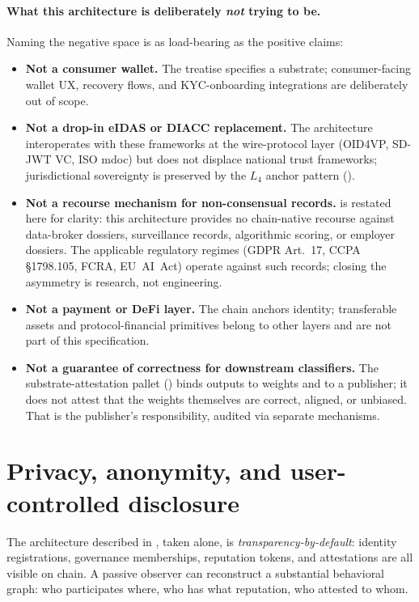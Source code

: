 \documentclass[11pt,a4paper,parskip=half-,DIV=12,headings=standardclasses]{scrartcl}
\theoremstyle{ncthm}
\theoremstyle{ncdef}
\begin{document}
\paragraph{What this architecture is deliberately \emph{not} trying
to be.} Naming the negative space is as load-bearing as the positive
claims:
\begin{itemize}
\item \textbf{Not a consumer wallet.} The treatise specifies a
  substrate; consumer-facing wallet UX, recovery flows, and
  KYC-onboarding integrations are deliberately out of scope.
\item \textbf{Not a drop-in eIDAS or DIACC replacement.} The
  architecture interoperates with these frameworks at the wire-protocol
  layer (OID4VP, SD-JWT VC, ISO mdoc) but does not displace national
  trust frameworks; jurisdictional sovereignty is preserved by the
  $L_4$ anchor pattern ().
\item \textbf{Not a recourse mechanism for non-consensual records.}
   is restated here for clarity: this
  architecture provides no chain-native recourse against data-broker
  dossiers, surveillance records, algorithmic scoring, or employer
  dossiers. The applicable regulatory regimes (GDPR Art.~17, CCPA
  \S{}1798.105, FCRA, EU~AI~Act) operate against such records;
  closing the asymmetry is research, not engineering.
\item \textbf{Not a payment or DeFi layer.} The chain anchors
  identity; transferable assets and protocol-financial primitives
  belong to other layers and are not part of this specification.
\item \textbf{Not a guarantee of correctness for downstream
  classifiers.} The substrate-attestation pallet ()
  binds outputs to weights and to a publisher; it does not attest
  that the weights themselves are correct, aligned, or unbiased.
  That is the publisher's responsibility, audited via separate
  mechanisms.
\end{itemize}

\section{Privacy, anonymity, and user-controlled disclosure}\label{sec:privacy}

The architecture described in
, taken alone, is
\emph{transparency-by-default}: identity registrations, governance
memberships, reputation tokens, and attestations are all visible on
chain. A passive observer can reconstruct a substantial behavioral
graph: who participates where, who has what reputation, who attested
to whom.
\end{document}
